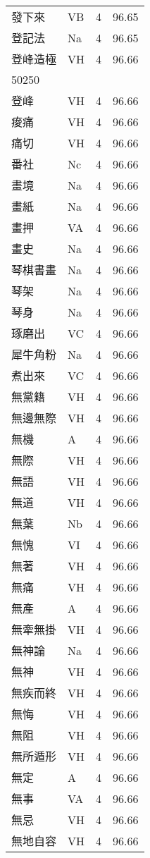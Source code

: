 \documentclass[twocolumn]{book}
\begin{document}
\begin{supertabular}{llrr}
發下來 & VB & 4 &  96.65\\
登記法 & Na & 4 &  96.65\\
登峰造極 & VH & 4 &  96.66\\
50250\\
登峰 & VH & 4 &  96.66\\
痠痛 & VH & 4 &  96.66\\
痛切 & VH & 4 &  96.66\\
番社 & Nc & 4 &  96.66\\
畫境 & Na & 4 &  96.66\\
畫紙 & Na & 4 &  96.66\\
畫押 & VA & 4 &  96.66\\
畫史 & Na & 4 &  96.66\\
琴棋書畫 & Na & 4 &  96.66\\
琴架 & Na & 4 &  96.66\\
琴身 & Na & 4 &  96.66\\
琢磨出 & VC & 4 &  96.66\\
犀牛角粉 & Na & 4 &  96.66\\
煮出來 & VC & 4 &  96.66\\
無黨籍 & VH & 4 &  96.66\\
無邊無際 & VH & 4 &  96.66\\
無機 & A & 4 &  96.66\\
無際 & VH & 4 &  96.66\\
無語 & VH & 4 &  96.66\\
無道 & VH & 4 &  96.66\\
無葉 & Nb & 4 &  96.66\\
無愧 & VI & 4 &  96.66\\
無著 & VH & 4 &  96.66\\
無痛 & VH & 4 &  96.66\\
無產 & A & 4 &  96.66\\
無牽無掛 & VH & 4 &  96.66\\
無神論 & Na & 4 &  96.66\\
無神 & VH & 4 &  96.66\\
無疾而終 & VH & 4 &  96.66\\
無悔 & VH & 4 &  96.66\\
無阻 & VH & 4 &  96.66\\
無所遁形 & VH & 4 &  96.66\\
無定 & A & 4 &  96.66\\
無事 & VA & 4 &  96.66\\
無忌 & VH & 4 &  96.66\\
無地自容 & VH & 4 &  96.66\\

\end{supertabular}
\end{document}

